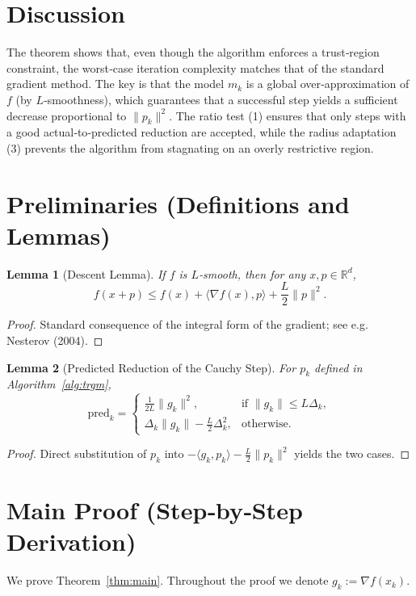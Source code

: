 \documentclass{article}
\newtheorem{lemma}{Lemma}
\begin{document}
\section*{Discussion}
The theorem shows that, even though the algorithm enforces a trust‑region constraint, the worst‑case iteration complexity matches that of the standard gradient method. The key is that the model $m_k$ is a global over‑approximation of $f$ (by $L$‑smoothness), which guarantees that a successful step yields a sufficient decrease proportional to $\|p_k\|^2$. The ratio test (1) ensures that only steps with a good actual‑to‑predicted reduction are accepted, while the radius adaptation (3) prevents the algorithm from stagnating on an overly restrictive region.

\section*{Preliminaries (Definitions and Lemmas)}
\begin{lemma}[Descent Lemma]\label{lem:descent}
If $f$ is $L$‑smooth, then for any $x,p\in\mathbb{R}^d$,
\[
f(x+p)\le f(x)+\langle\nabla f(x),p\rangle+\frac{L}{2}\|p\|^2.
\]
\end{lemma}
\begin{proof}
Standard consequence of the integral form of the gradient; see e.g. Nesterov (2004). \qedhere
\end{proof}

\begin{lemma}[Predicted Reduction of the Cauchy Step]\label{lem:pred}
For $p_k$ defined in Algorithm~\ref{alg:trgm},
\[
\text{pred}_k=
\begin{cases}
\displaystyle\frac{1}{2L}\|g_k\|^2, & \text{if }\|g_k\|\le L\Delta_k,\\[2ex]
\displaystyle\Delta_k\|g_k\|-\frac{L}{2}\Delta_k^2, & \text{otherwise.}
\end{cases}
\]
\end{lemma}
\begin{proof}
Direct substitution of $p_k$ into $-\langle g_k,p_k\rangle-\frac{L}{2}\|p_k\|^2$ yields the two cases. \qedhere
\end{proof}

\section*{Main Proof (Step‑by‑Step Derivation)}
We prove Theorem~\ref{thm:main}. Throughout the proof we denote $g_k:=\nabla f(x_k)$.
\end{document}
